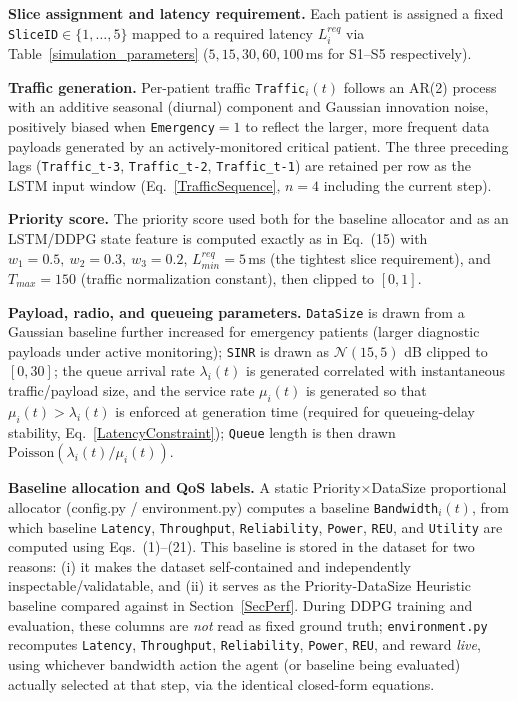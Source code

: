 \documentclass[10pt,journal,compsoc]{IEEEtran}
\begin{document}
\textbf{Slice assignment and latency requirement.} Each patient is assigned a
fixed \texttt{SliceID}$\in\{1,\dots,5\}$ mapped to a required latency
$L_i^{req}$ via Table~\ref{simulation_parameters}
($5,15,30,60,100$\,ms for S1--S5 respectively).
 
\textbf{Traffic generation.} Per-patient traffic \texttt{Traffic}$_i(t)$
follows an AR(2) process with an additive seasonal (diurnal) component and
Gaussian innovation noise, positively biased when \texttt{Emergency}$=1$ to
reflect the larger, more frequent data payloads generated by an
actively-monitored critical patient. The three preceding lags
(\texttt{Traffic\_t-3}, \texttt{Traffic\_t-2}, \texttt{Traffic\_t-1}) are
retained per row as the LSTM input window (Eq.~\eqref{TrafficSequence}, $n=4$
including the current step).
 
\textbf{Priority score.} The priority score used both for the baseline
allocator and as an LSTM/DDPG state feature is computed exactly as in
Eq.~(15) with $w_1=0.5,\ w_2=0.3,\ w_3=0.2$, $L^{req}_{min}=5$\,ms (the
tightest slice requirement), and $T_{max}=150$ (traffic normalization
constant), then clipped to $[0,1]$.
 
\textbf{Payload, radio, and queueing parameters.} \texttt{DataSize} is drawn
from a Gaussian baseline further increased for emergency patients (larger
diagnostic payloads under active monitoring); \texttt{SINR} is drawn as
$\mathcal{N}(15,5)$ dB clipped to $[0,30]$; the queue arrival rate
$\lambda_i(t)$ is generated correlated with instantaneous traffic/payload
size, and the service rate $\mu_i(t)$ is generated so that $\mu_i(t) >
\lambda_i(t)$ is enforced at generation time (required for queueing-delay
stability, Eq.~\eqref{LatencyConstraint}); \texttt{Queue} length is then drawn
$\mathrm{Poisson}(\lambda_i(t)/\mu_i(t))$.
 
\textbf{Baseline allocation and QoS labels.} A static Priority$\times$DataSize
proportional allocator (config.py / environment.py) computes a baseline
\texttt{Bandwidth}$_i(t)$, from which baseline \texttt{Latency},
\texttt{Throughput}, \texttt{Reliability}, \texttt{Power}, \texttt{REU}, and
\texttt{Utility} are computed using Eqs.~(1)--(21). This baseline is stored in
the dataset for two reasons: (i) it makes the dataset self-contained and
independently inspectable/validatable, and (ii) it serves as the
Priority-DataSize Heuristic baseline compared against in
Section~\ref{SecPerf}. During DDPG training and evaluation, these columns are
\emph{not} read as fixed ground truth; \texttt{environment.py} recomputes
\texttt{Latency}, \texttt{Throughput}, \texttt{Reliability}, \texttt{Power},
\texttt{REU}, and reward \emph{live}, using whichever bandwidth action the
agent (or baseline being evaluated) actually selected at that step, via the
identical closed-form equations.
 
\end{document}
